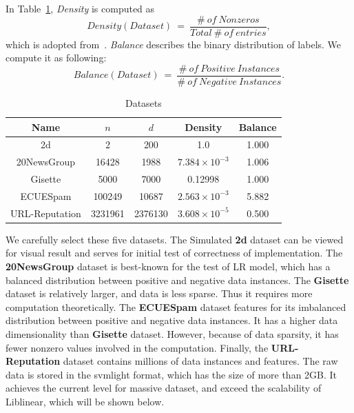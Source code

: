 \documentclass[10pt, conference, compsocconf]{IEEEtran}
\begin{document}
In Table~\ref{tab:table1}, \textit{Density} is computed as
\[
Density(Dataset)~=~\frac{\#~of~Nonzeros}{Total~\#~of~entries},
\]
which is adopted from~\cite{sarwar2001item}.
\textit{Balance} describes the binary distribution of labels.
We compute it as following:
\[
Balance(Dataset)~=~\frac{\#~of~Positive~Instances}{\#~of~Negative~Instances}.
\]
\begin{table}[h]
\centering
\caption{Datasets}\label{tab:table1}\vspace{-0.3cm}
\begin{tabular}{|c|c|c|c|c|}
\hline
    Name           & $n$ & $d$ & Density  & Balance \\
\hline
    2d             & 2             & 200            & 1.0                                & 1.000 \\
\hline
    20NewsGroup    & 16428         & 1988           & $7.384\times10^{-3}$               & 1.006 \\
\hline
    Gisette        & 5000          & 7000           & 0.12998                            & 1.000 \\
\hline
    ECUESpam       & 100249        & 10687          & $2.563\times10^{-3}$               & 5.882 \\
\hline
    URL-Reputation & 3231961       & 2376130        & $3.608\times10^{-5}$               & 0.500 \\
\hline
\end{tabular}
\end{table}
We carefully select these five datasets.
The Simulated \textbf{2d} dataset can be viewed for visual result and serves for initial test of correctness of implementation.
The \textbf{20NewsGroup} dataset is best-known for the test of LR model, which has a balanced distribution between positive and negative data instances.
The \textbf{Gisette} dataset is relatively larger, and data is less sparse. Thus it requires more computation theoretically.
The \textbf{ECUESpam} dataset features for its imbalanced distribution between positive and negative data instances. It has a higher data dimensionality than \textbf{Gisette} dataset. However, because of data sparsity, it has fewer nonzero values involved in the computation.
Finally, the \textbf{URL-Reputation} dataset contains millions of data instances and features. The raw data is stored in the svmlight format, which has the size of more than 2GB. It achieves the current level for massive dataset, and exceed the scalability of Liblinear, which will be shown below.
\end{document}
